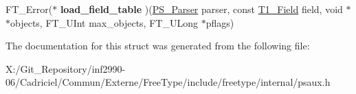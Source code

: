 \begin{DoxyCompactItemize}
\item 
\hypertarget{struct_p_s___parser___funcs_rec___ac925f8b8b583c22717da0475a2427863}{F\-T\-\_\-\-Error($\ast$ {\bfseries load\-\_\-field\-\_\-table} )(\hyperlink{struct_p_s___parser_rec__}{P\-S\-\_\-\-Parser} parser, const \hyperlink{struct_t1___field_rec__}{T1\-\_\-\-Field} field, void $\ast$$\ast$objects, F\-T\-\_\-\-U\-Int max\-\_\-objects, F\-T\-\_\-\-U\-Long $\ast$pflags)}\label{struct_p_s___parser___funcs_rec___ac925f8b8b583c22717da0475a2427863}

\end{DoxyCompactItemize}


The documentation for this struct was generated from the following file\-:\begin{DoxyCompactItemize}
\item 
X\-:/\-Git\-\_\-\-Repository/inf2990-\/06/\-Cadriciel/\-Commun/\-Externe/\-Free\-Type/include/freetype/internal/psaux.\-h\end{DoxyCompactItemize}

